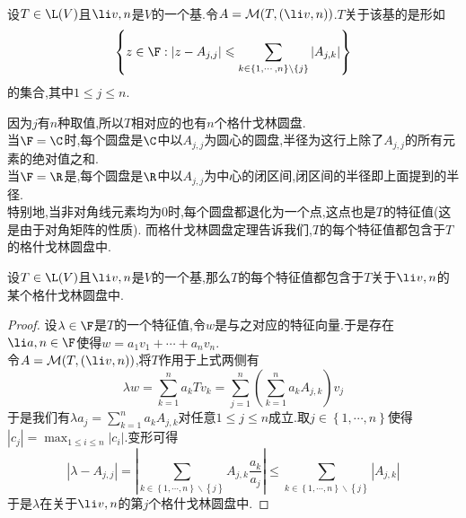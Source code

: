 \documentclass{ctexart}
\begin{document}
\\
\begin{definition}[3.1 定义:格什戈林圆盘]
    设$T\in\L(V)$且$\li v,n$是$V$的一个基.令$A=\mathcal{M}(T,(\li v,n))$.$T$关于该基的是形如
    $$\left\{z\in\F:\left|z-A_{j,j}\right|\leqslant\sum_{k\in\left\{1,\cdots,n\right\}\backslash\left\{j\right\}}\left|A_{j,k}\right|\right\}$$
    的集合,其中$1\leqslant j\leqslant n$.
\end{definition}\noindent
因为$j$有$n$种取值,所以$T$相对应的也有$n$个格什戈林圆盘.\\
当$\F=\C$时,每个圆盘是$\C$中以$A_{j,j}$为圆心的圆盘,半径为这行上除了$A_{j,j}$的所有元素的绝对值之和.\\
当$\F=\R$是,每个圆盘是$\R$中以$A_{j,j}$为中心的闭区间,闭区间的半径即上面提到的半径.\\
特别地,当非对角线元素均为$0$时,每个圆盘都退化为一个点,这点也是$T$的特征值(这是由于对角矩阵的性质).%
而格什戈林圆盘定理告诉我们,$T$的每个特征值都包含于$T$的格什戈林圆盘中.
\begin{formal}[3.2 格什戈林圆盘定理]
    设$T\in\L(V)$且$\li v,n$是$V$的一个基,那么$T$的每个特征值都包含于$T$关于$\li v,n$的某个格什戈林圆盘中.
\end{formal}
\begin{proof}
    设$\lambda\in\F$是$T$的一个特征值,令$w$是与之对应的特征向量.于是存在$\li a,n\in\F$使得$w=a_1v_1+\cdots+a_nv_n$.\\
    令$A=\mathcal{M}(T,(\li v,n))$,将$T$作用于上式两侧有
    $$\lambda w=\sum_{k=1}^{n}a_kTv_k=\sum_{j=1}^{n}\left(\sum_{k=1}^{n}a_kA_{j,k}\right)v_j$$
    于是我们有$\displaystyle\lambda a_j=\sum_{k=1}^{n}a_kA_{j,k}$对任意$1\leqslant j\leqslant n$成立.取$j\in\left\{1,\cdots,n\right\}$使得$\left|c_j\right|=\displaystyle\max_{1\leqslant i\leqslant n}\left|c_i\right|$.变形可得
    $$\left|\lambda-A_{j,j}\right|=\left|\sum_{k\in\left\{1,\cdots,n\right\}\backslash\left\{j\right\}}A_{j,k}\dfrac{a_k}{a_j}\right|\leqslant\sum_{k\in\left\{1,\cdots,n\right\}\backslash\left\{j\right\}}\left|A_{j,k}\right|$$
    于是$\lambda$在关于$\li v,n$的第$j$个格什戈林圆盘中.
\end{proof}
\end{document}
